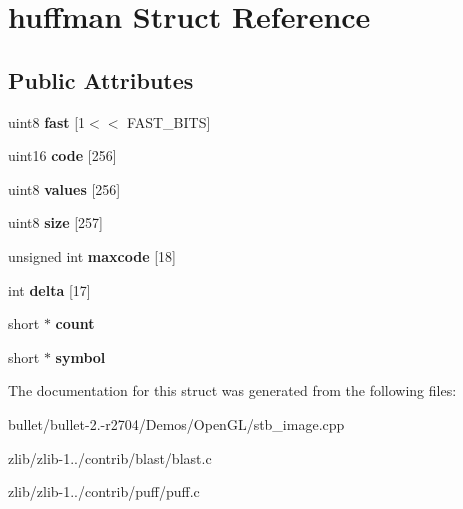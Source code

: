 \hypertarget{structhuffman}{\section{huffman Struct Reference}
\label{structhuffman}
}
\subsection*{Public Attributes}
\begin{DoxyCompactItemize}
\item 
\hypertarget{structhuffman_a9dbb29a8ed724a32f502d9595510ddc2}{uint8 {\bfseries fast} \mbox{[}1$<$$<$ F\+A\+S\+T\+\_\+\+B\+I\+T\+S\mbox{]}}\label{structhuffman_a9dbb29a8ed724a32f502d9595510ddc2}

\item 
\hypertarget{structhuffman_a9925018a95d5a2122cd732561fa0fa64}{uint16 {\bfseries code} \mbox{[}256\mbox{]}}\label{structhuffman_a9925018a95d5a2122cd732561fa0fa64}

\item 
\hypertarget{structhuffman_a313d78cf23f40b314c25681ff2a6224b}{uint8 {\bfseries values} \mbox{[}256\mbox{]}}\label{structhuffman_a313d78cf23f40b314c25681ff2a6224b}

\item 
\hypertarget{structhuffman_afdb0fbcf25aec42ba30b0d0e2453a057}{uint8 {\bfseries size} \mbox{[}257\mbox{]}}\label{structhuffman_afdb0fbcf25aec42ba30b0d0e2453a057}

\item 
\hypertarget{structhuffman_aeb78aca6c7377faaad8123566d54fc98}{unsigned int {\bfseries maxcode} \mbox{[}18\mbox{]}}\label{structhuffman_aeb78aca6c7377faaad8123566d54fc98}

\item 
\hypertarget{structhuffman_a04255e3e1c6de74d36a08a1aa4e9537d}{int {\bfseries delta} \mbox{[}17\mbox{]}}\label{structhuffman_a04255e3e1c6de74d36a08a1aa4e9537d}

\item 
\hypertarget{structhuffman_aa840fbb40b96c7d4a9ab84ff67a9150c}{short $\ast$ {\bfseries count}}\label{structhuffman_aa840fbb40b96c7d4a9ab84ff67a9150c}

\item 
\hypertarget{structhuffman_abe59777de15e216f772e4d430db93576}{short $\ast$ {\bfseries symbol}}\label{structhuffman_abe59777de15e216f772e4d430db93576}

\end{DoxyCompactItemize}


The documentation for this struct was generated from the following files\+:\begin{DoxyCompactItemize}
\item 
bullet/bullet-\/2.-\/r2704/\+Demos/\+Open\+G\+L/stb\+\_\+image.\+cpp\item 
zlib/zlib-\/1../contrib/blast/blast.\+c\item 
zlib/zlib-\/1../contrib/puff/puff.\+c\end{DoxyCompactItemize}
